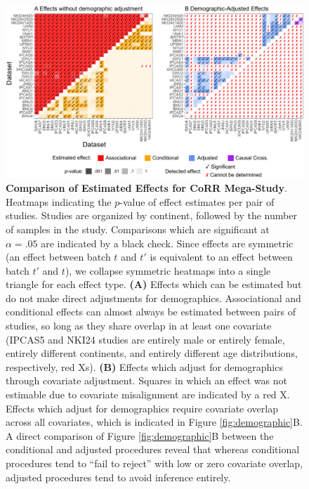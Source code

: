 \begin{figure}[h]
    \centering
    \includegraphics[width=\linewidth]{Figures/Content/raw_pairwise.pdf}
    \caption{\textbf{Comparison of Estimated Effects for CoRR Mega-Study}. Heatmaps indicating the $p$-value of effect estimates per pair of studies. Studies are organized by continent, followed by the number of samples in the study. Comparisons which are significant at $\alpha=.05$ are indicated by a black check. Since effects are symmetric (an effect between batch $t$ and $t'$ is equivalent to an effect between batch $t'$ and $t$), we collapse symmetric heatmaps into a single triangle for each effect type. \textbf{(A)} Effects which can be estimated but do not make direct adjustments for demographics. Associational and conditional effects can almost always be estimated between pairs of studies, so long as they share overlap in at least one covariate (IPCAS5 and NKI24 studies are entirely male or entirely female, entirely different continents, and entirely different age distributions, respectively, red Xs). \textbf{(B)} Effects which adjust for demographics through covariate adjustment. Squares in which an effect was not estimable due to covariate misalignment are indicated by a red X. Effects which adjust for demographics require covariate overlap across all covariates, which is indicated in Figure \ref{fig:demographic}B. A direct comparison of Figure \ref{fig:demographic}B between the conditional and adjusted procedures reveal that whereas conditional procedures tend to ``fail to reject'' with low or zero covariate overlap, adjusted procedures tend to avoid inference entirely.
    }
    \label{fig:raw_pairwise}
\end{figure}

